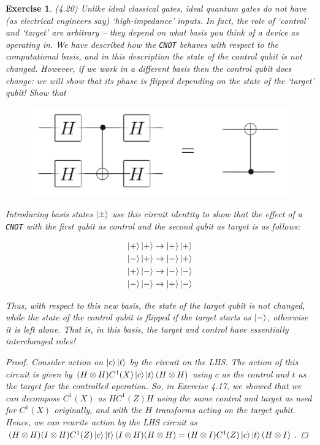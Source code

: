 \documentclass[11pt]{article}
\newcommand\0{\mathbf{0}}
\newcommand\<{\langle}
\renewcommand\>{\rangle}
\newtheorem{exercise}[theorem]{Exercise}
\begin{document}
\begin{exercise}(4.20) Unlike ideal classical gates, ideal quantum gates do not have (as electrical engineers say) ‘high-impedance’ inputs. In fact, the role of ‘control’ and ‘target’ are arbitrary – they depend on what basis you think of a device as operating in. We have described how the \texttt{CNOT} behaves with respect to the computational basis, and in this description the state of the control qubit is not changed. However, if we work in a different basis then the control qubit does change: we will show that its phase is flipped depending on the state of the ‘target’ qubit! Show that

\begin{figure}[H]
\centering
\includegraphics[width=.5\linewidth]{images/4_20.png}
\end{figure}

Introducing basis states $\ket{\pm}$ use this circuit identity to show that the effect of a \texttt{CNOT} with the first qubit as control and the second qubit as target is as follows:


\begin{align*}
\ket{+}\ket{+} \rightarrow \ket{+}\ket{+} \\	
\ket{-}\ket{+} \rightarrow \ket{-}\ket{+} \\	
\ket{+}\ket{-} \rightarrow \ket{-}\ket{-} \\	
\ket{-}\ket{-} \rightarrow \ket{+}\ket{-} 
\end{align*}

Thus, with respect to this new basis, the state of the target qubit is not changed, while the state of the control qubit is flipped if the target starts as $\ket{-}$, otherwise it is left alone. That is, in this basis, the target and control have essentially interchanged roles!

\begin{proof}
Consider action on $\ket{c}\ket{t}$ by the circuit on the LHS. The action of this circuit is given by $(H \otimes H) C^1(X)\ket{c}\ket{t} (H \otimes H)$ using $c$ as the control and $t$ as the target for the controlled operation. So, in Exercise 4.17, we showed that we can decompose $C^1(X)$ as $HC^1(Z)H$ using the same control and target as used for $C^1(X)$ originally, and with the $H$ transforms acting on the target qubit. Hence, we can rewrite action by the LHS circuit as $(H \otimes H) (I \otimes H) C^1(Z)\ket{c}\ket{t} (I \otimes H) (H \otimes H) = (H \otimes I) C^1(Z)\ket{c}\ket{t} (H \otimes I)$.


\end{proof}
\end{exercise}
\end{document}
